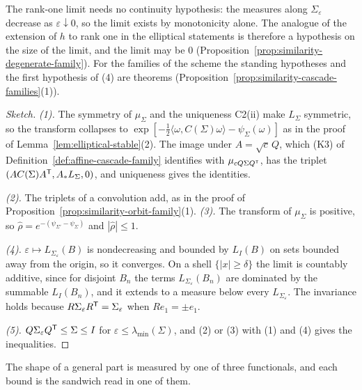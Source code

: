 The rank-one limit needs no continuity hypothesis: the \Levy{} measures along $\Sigma_\varepsilon$
decrease as $\varepsilon \downarrow 0$, so the limit exists by monotonicity alone. The analogue of the
extension of $h$ to rank one in the elliptical statements is therefore a hypothesis on the size of the
limit, and the limit may be $0$ (Proposition~\ref{prop:similarity-degenerate-family}). For the families of the scheme the standing hypotheses
and the first hypothesis of (4) are theorems (Proposition~\ref{prop:similarity-cascade-families}(1)).

\begin{proof}[Sketch]
\emph{(1).} The symmetry of $\mu_\Sigma$ and the uniqueness C2(ii) make $L_\Sigma$ symmetric, so the
transform collapses to $\exp[-\tfrac12\langle\omega,C(\Sigma)\omega\rangle - \psi_\Sigma(\omega)]$ as in the
proof of Lemma~\ref{lem:elliptical-stable}(2). The image under $A = \sqrt c\,Q$, which (K3) of
Definition~\ref{def:affine-cascade-family} identifies with $\mu_{cQ\Sigma Q^{\mathsf{T}}}$, has the triplet
$(AC(\Sigma)A^{\mathsf{T}}, A_*L_\Sigma, 0)$, and uniqueness gives the identities.

\emph{(2).} The triplets of a convolution add, as in the proof of
Proposition~\ref{prop:similarity-orbit-family}(1). \emph{(3).} The transform of $\mu_\Sigma$ is positive, so
$\widehat\rho = e^{-(\psi_{\Sigma'} - \psi_\Sigma)}$ and $|\widehat\rho| \le 1$.

\emph{(4).} $\varepsilon \mapsto L_{\Sigma_\varepsilon}(B)$ is nondecreasing and bounded by $L_I(B)$ on sets
bounded away from the origin, so it converges. On a shell $\{|x| \ge \delta\}$ the limit is countably
additive, since for disjoint $B_n$ the terms $L_{\Sigma_\varepsilon}(B_n)$ are dominated by the summable
$L_I(B_n)$, and it extends to a \Levy{} measure below every $L_{\Sigma_\varepsilon}$. The invariance holds because $R\Sigma_\varepsilon R^{\mathsf{T}} =
\Sigma_\varepsilon$ when $Re_1 = \pm e_1$.

\emph{(5).} $Q\Sigma_\varepsilon Q^{\mathsf{T}} \le \Sigma \le I$ for $\varepsilon \le \lambda_{\min}(\Sigma)$, and (2) or
(3) with (1) and (4) gives the inequalities.
\end{proof}

The shape of a general part is measured by one of three functionals, and each bound is the sandwich
read in one of them.

